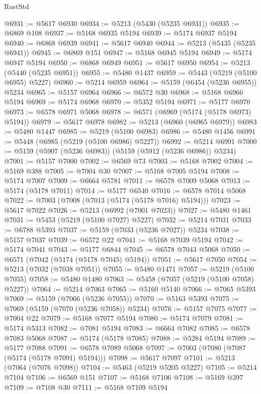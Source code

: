 \begin{lexlean}{RustStd}
\begin{coremodule}
@6931 := @5617 @6930
@6934 := @5213 (@5430 (@5235 @6931))
@6935 := @6869 @108
@6937 := @5168 @6935 @5194
@6939 := @5174 @6937 @5194
@6940 := @6868 @6939
@6941 := @5617 @6940
@6944 := @5213 (@5435 (@5235 @6941))
@6945 := @6869 @151
@6947 := @5168 @6945 @5194
@6949 := @5174 @6947 @5194
@6950 := @6868 @6949
@6951 := @5617 @6950
@6954 := @5213 (@5440 (@5235 @6951))
@6955 := @5480 @1437
@6959 := @5443 (@5219 (@5100 @6955) @5227)
@6960 := @5214 @6959
@6964 := @5159 (@6454 (@5236 @6955)) @5234
@6965 := @5157 @6964
@6966 := @6572 @30
@6968 := @5168 @6966 @5194
@6969 := @5174 @6968
@6970 := @5352 @5194
@6971 := @5177 @6970
@6973 := @6578 @6971 @5068
@6978 := @6571 (@6969 (@5174 (@5178 @6973) @5194))
@6979 := @5617 @6978
@6982 := @5213 (@6960 (@6965 @6979))
@6983 := @5480 @1447
@6985 := @5219 (@5100 @6983)
@6986 := @5480 @1456
@6991 := @5448 (@6985 (@5219 (@5100 @6986) @5227))
@6992 := @5214 @6991
@7000 := @5159 (@5907 (@5236 @6983)) (@5159 (@5912 (@5236 @6986)) @5234)
@7001 := @5157 @7000
@7002 := @6569 @73
@7003 := @5168 @7002
@7004 := @5169 @388
@7005 := @7004 @30
@7007 := @5168 @7005 @5194
@7008 := @5174 @7007
@7009 := @6664 @5781
@7011 := @6578 @7009 @5068
@7013 := @5174 (@5178 @7011)
@7014 := @5177 @6540
@7016 := @6578 @7014 @5068
@7022 := @7003 (@7008 (@7013 (@5174 (@5178 @7016) @5194)))
@7023 := @5617 @7022
@7026 := @5213 (@6992 (@7001 @7023))
@7027 := @5480 @1461
@7031 := @5453 (@5219 (@5100 @7027) @5227)
@7032 := @5214 @7031
@7033 := @6788 @5393
@7037 := @5159 (@7033 (@5236 @7027)) @5234
@7038 := @5157 @7037
@7039 := @6572 @22
@7041 := @5168 @7039 @5194
@7042 := @5174 @7041
@7043 := @5177 @6844
@7045 := @6578 @7043 @5068
@7050 := @6571 (@7042 (@5174 (@5178 @7045) @5194))
@7051 := @5617 @7050
@7054 := @5213 (@7032 (@7038 @7051))
@7055 := @5480 @1471
@7057 := @5219 (@5100 @7055)
@7058 := @5480 @1480
@7063 := @5458 (@7057 (@5219 (@5100 @7058) @5227))
@7064 := @5214 @7063
@7065 := @5160 @5140
@7066 := @7065 @5393
@7069 := @5159 (@7066 (@5236 @7055))
@7070 := @5163 @5393
@7075 := @7069 (@5159 (@7070 (@5236 @7058)) @5234)
@7076 := @5157 @7075
@7077 := @7004 @22
@7079 := @5168 @7077 @5194
@7080 := @5174 @7079
@7081 := @5174 @5313
@7082 := @7081 @5194
@7083 := @6664 @7082
@7085 := @6578 @7083 @5068
@7087 := @5174 (@5178 @7085)
@7088 := @5284 @5194
@7089 := @5177 @7088
@7091 := @6578 @7089 @5068
@7097 := @7003 (@7080 (@7087 (@5174 (@5178 @7091) @5194)))
@7098 := @5617 @7097
@7101 := @5213 (@7064 (@7076 @7098))
@7104 := @5463 (@5219 @5205 @5227)
@7105 := @5214 @7104
@7106 := @6569 @151
@7107 := @5168 @7106
@7108 := @5169 @397
@7109 := @7108 @30
@7111 := @5168 @7109 @5194

\end{coremodule}
\end{lexlean}
